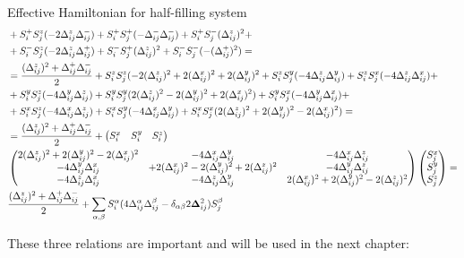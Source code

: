 \begin{section}{Effective Hamiltonian for half-filling system}
\begin{align*}
&+ S_i^+S_j^z(-2\Delta_{ij}^z\Delta_{ij}^-) + S_i^+S_j^+(-\Delta_{ij}^-\Delta_{ij}^-) + S_i^+S_j^-(\Delta_{ij}^z)^2 +\\
&+ S_i^-S_j^z(-2\Delta_{ij}^z\Delta_{ij}^+) + S_i^-S_j^+(\Delta_{ij}^z)^2 + S_i^-S_j^-(-(\Delta_{ij}^+)^2) = \\
&= \frac{(\Delta_{ij}^z)^2+\Delta_{ij}^+\Delta_{ij}^-}{2} + S_i^zS_j^z(-2(\Delta_{ij}^z)^2+2(\Delta_{ij}^x)^2+2(\Delta_{ij}^y)^2 + S_i^zS_j^y(-4\Delta_{ij}^z\Delta_{ij}^y)+S_i^zS_j^x(-4\Delta_{ij}^z\Delta_{ij}^x) + \\
&+S_i^yS_j^z(-4\Delta_{ij}^y\Delta_{ij}^z)+S_i^yS_j^y(2(\Delta_{ij}^z)^2-2(\Delta_{ij}^y)^2+2(\Delta_{ij}^x)^2)+S_i^yS_j^x(-4\Delta_{ij}^y\Delta_{ij}^x) + \\
&+ S_i^xS_j^z(-4\Delta_{ij}^x\Delta_{ij}^z) + S_i^xS_j^y(-4\Delta_{ij}^x\Delta_{ij}^y) + S_i^xS_j^x(2(\Delta_{ij}^z)^2+2(\Delta_{ij}^y)^2-2(\Delta_{ij}^x)^2) = \\
&= \frac{(\Delta_{ij}^z)^2+\Delta_{ij}^+\Delta_{ij}^-}{2} + \begin{pmatrix}
S_i^x & S_i^y & S_i^z
\end{pmatrix}
\\
&\begin{pmatrix}
2(\Delta_{ij}^z)^2 + 2(\Delta_{ij}^y)^2 - 2(\Delta_{ij}^x)^2 & -4\Delta_{ij}^x\Delta_{ij}^y & -4\Delta_{ij}^x\Delta_{ij}^z \\ -4\Delta_{ij}^y\Delta_{ij}^x & +2(\Delta_{ij}^x)^2-2(\Delta_{ij}^y)^2 +2(\Delta_{ij}^z)^2 & -4\Delta_{ij}^y\Delta_{ij}^z \\ -4\Delta_{ij}^z\Delta_{ij}^x & -4\Delta_{ij}^z\Delta_{ij}^y & 2(\Delta_{ij}^x)^2+2(\Delta_{ij}^y)^2-2(\Delta_{ij}^z)^2
\end{pmatrix}
\begin{pmatrix}
S_j^x \\ S_j^y \\ S_j^z
\end{pmatrix} = \\
&\frac{(\Delta_{ij}^z)^2+\Delta_{ij}^+\Delta_{ij}^-}{2} + \sum_{\alpha, \beta} S_i^\alpha (4\Delta_{ij}^\alpha\Delta_{ij}^\beta - \delta_{\alpha \beta} 2\boldsymbol{\Delta}_{ij}^2) S_j^\beta
\end{align*}

These three relations are important and will be used in the next chapter:


\end{section}
